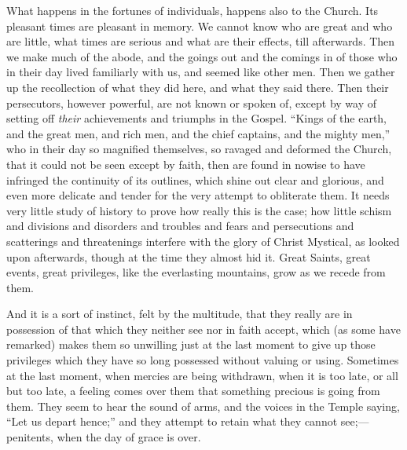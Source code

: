 What happens in the fortunes of individuals, happens also to the
Church. Its pleasant times are pleasant in memory. We cannot know who
are great and who are little, what times are serious and what are
their effects, till afterwards. Then we make much of the abode, and
the goings out and the comings in of those who in their day lived
familiarly with us, and seemed like other men. Then we gather up the
recollection of what they did here, and what they said there. Then
their persecutors, however powerful, are not known or spoken of,
except by way of setting off \emph{their} achievements and triumphs in
the Gospel. ``Kings of the earth, and the great men, and rich men,
and the chief captains, and the mighty men,'' who in their day so
magnified themselves, so ravaged and deformed the Church, that it
could not be seen except by faith, then are found in nowise to have
infringed the continuity of its outlines, which shine out clear and
glorious, and even more delicate and tender for the very attempt to
obliterate them. It needs very little study of history to prove how
really this is the case; how little schism and divisions and disorders
and troubles and fears and persecutions and scatterings and
threatenings interfere with the glory of Christ Mystical, as looked
upon afterwards, though at the time they almost hid it. Great Saints,
great events, great privileges, like the everlasting mountains, grow
as we recede from them.

And it is a sort of instinct, felt by the multitude, that they
really are in possession of that which they neither see nor in faith
accept, which (as some have remarked) makes them so unwilling just at
the last moment to give up those privileges which they have so long
possessed without valuing or using. Sometimes at the last moment, when
mercies are being withdrawn, when it is too late, or all but too late,
a feeling comes over them that something precious is going from them.
They seem to hear the sound of arms, and the voices in the Temple
saying, ``Let us depart hence;'' and they attempt to retain
what they cannot see;—penitents, when the day of grace is over.

